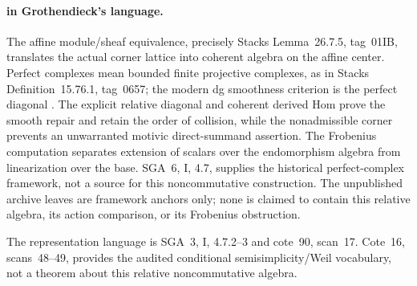 \paragraph{ in Grothendieck's language.}
The affine module/sheaf equivalence, precisely
Stacks Lemma~26.7.5, tag~01IB, translates the actual
corner lattice into coherent algebra on the affine
center. Perfect complexes mean bounded finite
projective complexes, as in Stacks Definition~15.76.1,
tag~0657; the modern dg smoothness criterion is
the perfect diagonal
\cite[\S5.1, pp.~13--14]{TabuadaWeil}.
The explicit relative diagonal and coherent derived
Hom prove the smooth repair and retain the order of
collision, while the nonadmissible corner prevents
an unwarranted motivic direct-summand assertion.
The Frobenius computation separates extension of
scalars over the endomorphism algebra from
linearization over the base. SGA~6, I, 4.7, supplies the
historical perfect-complex framework, not a
source for this noncommutative construction.
The unpublished archive leaves are framework
anchors only; none is claimed to contain this
relative algebra, its action comparison, or its
Frobenius obstruction.

The representation language is SGA~3, I, 4.7.2--3 and
cote~90, scan~17. Cote~16, scans~48--49, provides the
audited conditional semisimplicity/Weil vocabulary, not
a theorem about this relative noncommutative algebra.
